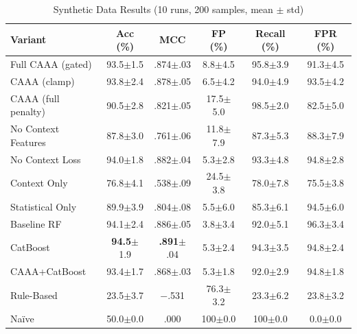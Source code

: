 \documentclass[12pt,a4paper]{report}
\begin{document}
\begin{table}[h]
    \centering
    \caption{Synthetic Data Results (10 runs, 200 samples, mean $\pm$ std)}
    \label{tab:synthetic}
    \small
    \begin{tabular}{lccccc}
        \toprule
        \textbf{Variant} & \textbf{Acc (\%)} & \textbf{MCC} & \textbf{FP (\%)} & \textbf{Recall (\%)} & \textbf{FPR (\%)} \\
        \midrule
        Full CAAA (gated) & 93.5$\pm$1.5 & .874$\pm$.03 & 8.8$\pm$4.5 & 95.8$\pm$3.9 & 91.3$\pm$4.5 \\
        CAAA (clamp) & 93.8$\pm$2.4 & .878$\pm$.05 & 6.5$\pm$4.2 & 94.0$\pm$4.9 & 93.5$\pm$4.2 \\
        CAAA (full penalty) & 90.5$\pm$2.8 & .821$\pm$.05 & 17.5$\pm$5.0 & 98.5$\pm$2.0 & 82.5$\pm$5.0 \\
        \midrule
        No Context Features & 87.8$\pm$3.0 & .761$\pm$.06 & 11.8$\pm$7.9 & 87.3$\pm$5.3 & 88.3$\pm$7.9 \\
        No Context Loss & 94.0$\pm$1.8 & .882$\pm$.04 & 5.3$\pm$2.8 & 93.3$\pm$4.8 & 94.8$\pm$2.8 \\
        Context Only & 76.8$\pm$4.1 & .538$\pm$.09 & 24.5$\pm$3.8 & 78.0$\pm$7.8 & 75.5$\pm$3.8 \\
        Statistical Only & 89.9$\pm$3.9 & .804$\pm$.08 & 5.5$\pm$6.0 & 85.3$\pm$6.1 & 94.5$\pm$6.0 \\
        \midrule
        Baseline RF & 94.1$\pm$2.4 & .886$\pm$.05 & 3.8$\pm$3.4 & 92.0$\pm$5.1 & 96.3$\pm$3.4 \\
        CatBoost & \textbf{94.5}$\pm$1.9 & \textbf{.891}$\pm$.04 & 5.3$\pm$2.4 & 94.3$\pm$3.5 & 94.8$\pm$2.4 \\
        CAAA+CatBoost & 93.4$\pm$1.7 & .868$\pm$.03 & 5.3$\pm$1.8 & 92.0$\pm$2.9 & 94.8$\pm$1.8 \\
        \midrule
        Rule-Based & 23.5$\pm$3.7 & $-$.531 & 76.3$\pm$3.2 & 23.3$\pm$6.2 & 23.8$\pm$3.2 \\
        Na\"ive & 50.0$\pm$0.0 & .000 & 100$\pm$0.0 & 100$\pm$0.0 & 0.0$\pm$0.0 \\
        \bottomrule
    \end{tabular}
\end{table}
\end{document}
